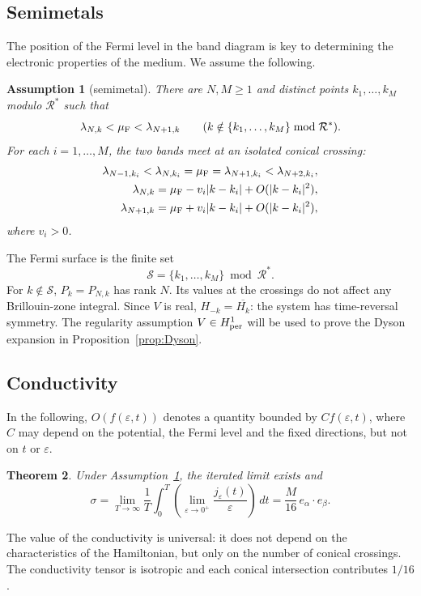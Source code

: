 \documentclass[a4paper,11pt]{article}
\theoremstyle{plain}
\newtheorem{theorem}{Theorem}[section]
\newtheorem{assumption}[theorem]{Assumption}
\theoremstyle{remark}
\def\eps{{\varepsilon}}
\def\cR{{\mathcal R}}
\begin{document}
\subsection{Semimetals}\label{sec:semimetal-assumptions}
The position of the Fermi level in the band diagram is key to determining
the electronic properties of the medium. We assume the following.
\begin{assumption}[semimetal]\label{ass:semimetal}
There are $N,M\ge1$ and distinct points $k_1,\ldots,k_M$ modulo $\cR^*$ such that
\[
\lambda_{N,k}<\mu_{\rm F}<\lambda_{N+1,k}\qquad
(k\notin\{k_1,\ldots,k_M\}\bmod\cR^*).
\]
For each $i=1,\ldots,M$, the two bands meet at an isolated conical crossing:
\begin{align}
\lambda_{N-1,k_i}<\lambda_{N,k_i}=\mu_{\rm F}
=\lambda_{N+1,k_i}<\lambda_{N+2,k_i},\label{hyp:semimetals_1}\\
\lambda_{N,k}=\mu_{\rm F}-v_i|k-k_i|+O(|k-k_i|^2),\label{hyp:semimetals_2}\\
\lambda_{N+1,k}=\mu_{\rm F}+v_i|k-k_i|+O(|k-k_i|^2),\label{hyp:semimetals_3}
\end{align}
where $v_i>0$.
\end{assumption}
The Fermi surface is the finite set
\begin{equation}\label{eq:Fermi_surface}
\mathcal S=\{k_1,\ldots,k_M\}\bmod\cR^*.
\end{equation}
For $k\notin\mathcal S$, $P_k=P_{N,k}$ has rank $N$. Its values at the
crossings do not affect any Brillouin-zone integral. Since $V$ is real,
$H_{-k}=\overline{H_k}$: the system has time-reversal symmetry.
The regularity assumption $V\in H^1_{\rm per}$ will be used to prove the
Dyson expansion in Proposition~\ref{prop:Dyson}.


\subsection{Conductivity}
In the following, $O(f(\eps,t))$ denotes a quantity bounded by $Cf(\eps,t)$,
where $C$ may depend on the potential, the Fermi level and the fixed
directions, but not on $t$ or $\eps$.
\begin{theorem}\label{theo:semi-metal}
Under Assumption~\ref{ass:semimetal}, the iterated limit exists and
\[
\sigma=\lim_{T\to\infty}\frac1T\int_0^T
\left(\lim_{\eps\to0^+}\frac{j_\eps(t)}{\eps}\right)\,dt
=\frac{M}{16}\,e_\alpha\cdot e_\beta.
\]
\end{theorem}
The value of the conductivity is universal: it does not depend on the
characteristics of the Hamiltonian, but only on the number of conical
crossings. The conductivity tensor is isotropic and each conical
intersection contributes $1/16$.
\end{document}
